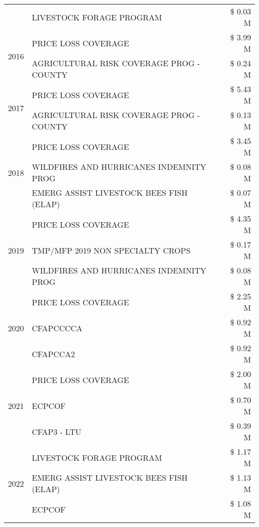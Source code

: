 \begin{tabular}{llr}
 & LIVESTOCK FORAGE PROGRAM & \$ 0.03 M \\
\cline{1-3}
\multirow[t]{2}{*}{2016} & PRICE LOSS COVERAGE & \$ 3.99 M \\
 & AGRICULTURAL RISK COVERAGE PROG - COUNTY & \$ 0.24 M \\
\cline{1-3}
\multirow[t]{2}{*}{2017} & PRICE LOSS COVERAGE & \$ 5.43 M \\
 & AGRICULTURAL RISK COVERAGE PROG - COUNTY & \$ 0.13 M \\
\cline{1-3}
\multirow[t]{3}{*}{2018} & PRICE LOSS COVERAGE & \$ 3.45 M \\
 & WILDFIRES AND HURRICANES INDEMNITY PROG & \$ 0.08 M \\
 & EMERG ASSIST LIVESTOCK BEES FISH (ELAP) & \$ 0.07 M \\
\cline{1-3}
\multirow[t]{3}{*}{2019} & PRICE LOSS COVERAGE & \$ 4.35 M \\
 & TMP/MFP 2019 NON SPECIALTY CROPS & \$ 0.17 M \\
 & WILDFIRES AND HURRICANES INDEMNITY PROG & \$ 0.08 M \\
\cline{1-3}
\multirow[t]{3}{*}{2020} & PRICE LOSS COVERAGE & \$ 2.25 M \\
 & CFAPCCCCA & \$ 0.92 M \\
 & CFAPCCA2 & \$ 0.92 M \\
\cline{1-3}
\multirow[t]{3}{*}{2021} & PRICE LOSS COVERAGE & \$ 2.00 M \\
 & ECPCOF & \$ 0.70 M \\
 & CFAP3 - LTU & \$ 0.39 M \\
\cline{1-3}
\multirow[t]{3}{*}{2022} & LIVESTOCK FORAGE PROGRAM & \$ 1.17 M \\
 & EMERG ASSIST LIVESTOCK BEES FISH (ELAP) & \$ 1.13 M \\
 & ECPCOF & \$ 1.08 M \\
\cline{1-3}
\bottomrule
\end{tabular}
